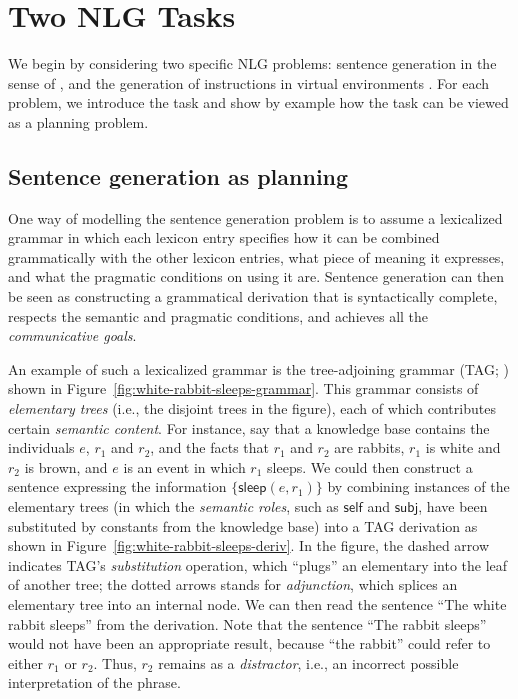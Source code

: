 \section{Two NLG Tasks}
\label{sec:domains}

We begin by considering two specific NLG problems: sentence generation in
the sense of \citet{KolSto07}, and the generation of instructions in
virtual environments \citep{ByrKolStrCasDalMooObe09}. For each problem, we
introduce the task and show by example how the task can be viewed as a
planning problem.


\subsection{Sentence generation as planning}
\label{sec:domain-crisp}

One way of modelling the sentence generation problem is to assume a
lexicalized grammar in which each lexicon entry specifies how it can
be combined grammatically with the other lexicon entries, what piece
of meaning it expresses, and what the pragmatic conditions on using it
are. Sentence generation can then be seen as constructing a
grammatical derivation that is syntactically complete, respects the
semantic and pragmatic conditions, and achieves all the
\emph{communicative goals}.

An example of such a lexicalized grammar is the tree-adjoining grammar
(TAG; \citealt{joshi;etal1997}) shown in
Figure~\ref{fig:white-rabbit-sleeps-grammar}. This grammar consists of
\emph{elementary trees} (i.e., the disjoint trees in the figure), each of
which contributes certain \emph{semantic content}. For instance, say that a
knowledge base contains the individuals $e$, $r_1$ and $r_2$, and the facts
that $r_1$ and $r_2$ are rabbits, $r_1$ is white and $r_2$ is brown, and
$e$ is an event in which $r_1$ sleeps. We could then construct a sentence
expressing the information $\{\mathsf{sleep}(e,r_1)\}$ by combining
instances of the elementary trees (in which the \emph{semantic roles}, such
as $\mathsf{self}$ and $\mathsf{subj}$, have been substituted by constants
from the knowledge base) into a TAG derivation as shown in
Figure~\ref{fig:white-rabbit-sleeps-deriv}. In the figure, the dashed arrow
indicates TAG's \emph{substitution} operation, which ``plugs'' an
elementary into the leaf of another tree; the dotted arrows stands for
\emph{adjunction}, which splices an elementary tree into an internal node.
We can then read the sentence ``The white rabbit sleeps'' from the
derivation. Note that the sentence ``The rabbit sleeps'' would not have
been an appropriate result, because ``the rabbit'' could refer to either
$r_1$ or $r_2$. Thus, $r_2$ remains as a \emph{distractor}, i.e., an
incorrect possible interpretation of the phrase.

